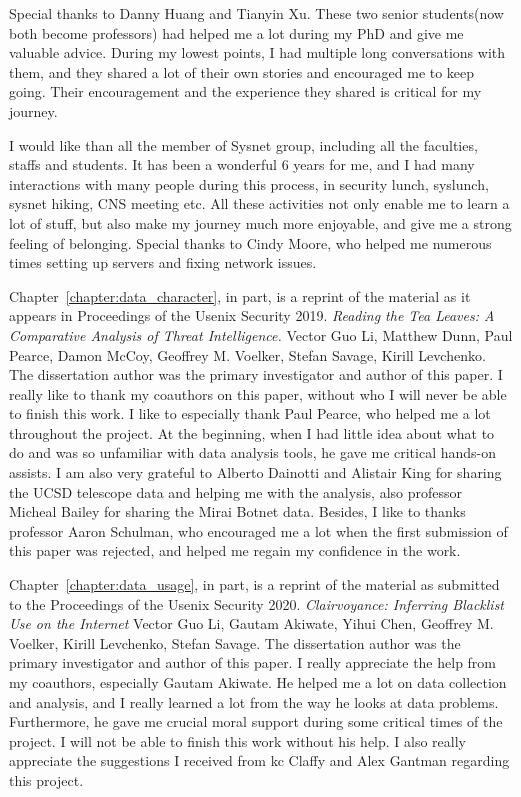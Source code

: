 \begin{acknowledgements}
Special thanks to Danny Huang and Tianyin Xu. These two senior students(now 
both become professors) had helped me a lot during my PhD and give me
valuable advice. During my lowest points, I had multiple long conversations
with them, and they shared a lot of their own stories and encouraged me to
keep going. Their encouragement and the experience they shared is critical 
for my journey.

I would like than all the member of Sysnet group, including all the faculties,
staffs and students. It has been a wonderful 6 years for me, and I had many 
interactions with many people during this process, in security lunch, 
syslunch, sysnet hiking, CNS meeting etc. All these activities not only enable
me to learn a lot of stuff, but also make my journey much more enjoyable, and 
give me a strong feeling of belonging. Special thanks to Cindy Moore, who 
helped me numerous times setting up servers and fixing network issues. 

Chapter~\ref{chapter:data_character}, in part, is a reprint of the material 
as it appears in Proceedings of the Usenix Security 2019. \textit{Reading the 
Tea Leaves: A Comparative Analysis of Threat Intelligence.} Vector Guo Li,
Matthew Dunn, Paul Pearce, Damon McCoy, Geoffrey M. Voelker, Stefan Savage,
Kirill Levchenko. The dissertation author was the primary investigator and 
author of this paper. I really like to thank my coauthors on this paper,
without who I will never be able to finish this work. I like to especially 
thank Paul Pearce, who helped me a lot throughout the project. At the
beginning, when I had little idea about what to do and was so unfamiliar with 
data analysis tools, he gave me critical hands-on assists. I am also very
grateful to Alberto Dainotti and Alistair King for sharing the UCSD telescope
data and helping me with the analysis, also professor Micheal Bailey for 
sharing the Mirai Botnet data. Besides, I like to thanks professor Aaron 
Schulman, who encouraged me a lot when the first submission of this paper 
was rejected, and helped me regain my confidence in the work.

Chapter~\ref{chapter:data_usage}, in part, is a reprint of the material as 
submitted to the Proceedings of the Usenix Security 2020. \textit{
Clairvoyance: Inferring Blacklist Use on the Internet} Vector Guo Li, 
Gautam Akiwate, Yihui Chen, Geoffrey M. Voelker, Kirill Levchenko, Stefan 
Savage. The dissertation author was the primary investigator and author of 
this paper. I really appreciate the help from my coauthors, especially 
Gautam Akiwate. He helped me a lot on data collection and analysis,
and I really learned a lot from the way he looks at data problems. 
Furthermore, he gave me crucial moral support during some critical times
of the project. I will not be able to finish this work without his help.
I also really appreciate the suggestions I received from kc Claffy and 
Alex Gantman regarding this project.


\end{acknowledgements}
